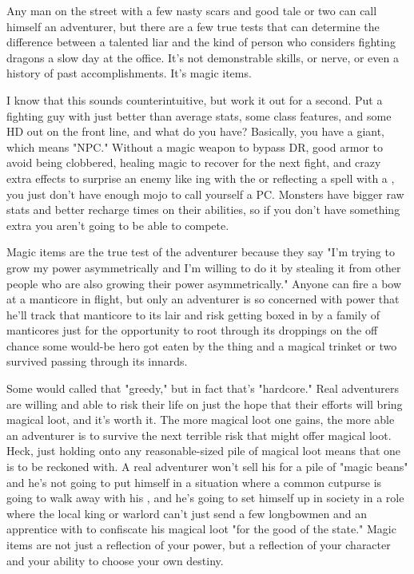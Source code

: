 Any man on the street with a few nasty scars and good tale or two can call himself an adventurer, but there are a few true tests that can determine the difference between a talented liar and the kind of person who considers fighting dragons a slow day at the office. It's not demonstrable skills, or nerve, or even a history of past accomplishments. It's magic items.

I know that this sounds counterintuitive, but work it out for a second. Put a fighting guy with just better than average stats, some class features, and some HD out on the front line, and what do you have? Basically, you have a giant, which means "NPC." Without a magic weapon to bypass DR, good armor to avoid being clobbered, healing magic to recover for the next fight, and crazy extra effects to surprise an enemy like ing with the  or reflecting a spell with a , you just don't have enough mojo to call yourself a PC. Monsters have bigger raw stats and better recharge times on their abilities, so if you don't have something extra you aren't going to be able to compete.

Magic items are the true test of the adventurer because they say "I'm trying to grow my power asymmetrically and I'm willing to do it by stealing it from other people who are also growing their power asymmetrically." Anyone can fire a bow at a manticore in flight, but only an adventurer is so concerned with power that he'll track that manticore to its lair and risk getting boxed in by a family of manticores just for the opportunity to root through its droppings on the off chance some would-be hero got eaten by the thing and a magical trinket or two survived passing through its innards.

Some would called that "greedy," but in fact that's "hardcore." Real adventurers are willing and able to risk their life on just the hope that their efforts will bring magical loot, and it's worth it. The more magical loot one gains, the more able an adventurer is to survive the next terrible risk that might offer magical loot. Heck, just holding onto any reasonable-sized pile of magical loot means that one is to be reckoned with. A real adventurer won't sell his  for a pile of "magic beans" and he's not going to put himself in a situation where a common cutpurse is going to walk away with his , and he's going to set himself up in society in a role where the local king or warlord can't just send a few longbowmen and an apprentice with  to confiscate his magical loot "for the good of the state." Magic items are not just a reflection of your power, but a reflection of your character and your ability to choose your own destiny.


